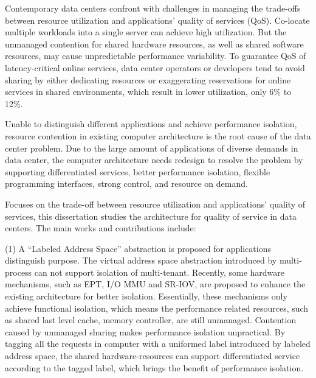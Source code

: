 
\begin{eabstract}
  Contemporary data centers confront with challenges in
  managing the trade-offs between resource utilization and
  applications’ quality of services (QoS). 
  Co-locate multiple workloads into a single server can
  achieve high utilization.
  But the unmanaged contention for shared hardware resources,
  as well as shared software resources,
  may cause unpredictable performance variability.
  To guarantee QoS of latency-critical online services,
  data center operators or developers tend to avoid sharing by
  either dedicating resources or exaggerating reservations
  for online services in shared environments,
  which result in lower utilization, only 6\% to 12\%.

  Unable to distinguish different applications and achieve performance isolation,
  resource contention in existing computer architecture is the root cause of
  the data center problem.
  Due to the large amount of applications of diverse demands in data center,
  the computer architecture needs redesign to resolve the problem
  by supporting differentiated services, better performance isolation,
  flexible programming interfaces, strong control, and resource on demand.
  
  Focuses on the trade-off between resource utilization and applications'
  quality of services, this dissertation studies the architecture for quality of service
  in data centers. The main works and contributions include:

  (1) A ``Labeled Address Space'' abstraction is proposed
      for applications distinguish purpose.
      The virtual address space abstraction introduced by multi-process
      can not support isolation of multi-tenant.
      Recently, some hardware mechanisms, such as EPT, I/O MMU and SR-IOV,
      are proposed to enhance the existing architecture for better isolation.
      Essentially, these mechanisms only achieve functional isolation,
      which means the performance related resources,
      such as shared last level cache, memory controller, are still unmanaged.
      Contention caused by unmanaged sharing makes performance isolation unpractical.
      By tagging all the requests in computer with a uniformed label introduced by
      labeled address space, the shared hardware-resources can support
      differentiated service according to the tagged label,
      which brings the benefit of performance isolation.


\end{eabstract}
